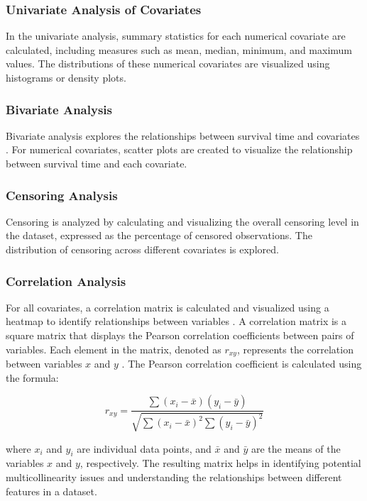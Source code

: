 \subsubsection*{Univariate Analysis of Covariates}

In the univariate analysis, summary statistics for each numerical covariate are calculated, including measures such as mean, median, minimum, and maximum values. The distributions of these numerical covariates are visualized using histograms or density plots. 

\subsubsection*{Bivariate Analysis}

Bivariate analysis explores the relationships between survival time and covariates \parencite{harrell__regression_2015}. For numerical covariates, scatter plots are created to visualize the relationship between survival time and each covariate. 

\subsubsection*{Censoring Analysis}

Censoring is analyzed by calculating and visualizing the overall censoring level in the dataset, expressed as the percentage of censored observations. The distribution of censoring across different covariates is explored.
\subsubsection*{Correlation Analysis}
For all covariates, a correlation matrix is calculated and visualized using a heatmap to identify relationships between variables \parencite{harrell__regression_2015}. A correlation matrix is a square matrix that displays the Pearson correlation coefficients between pairs of variables. Each element in the matrix, denoted as \( r_{xy} \), represents the correlation between variables \( x \) and \( y \) \parencite{harrell__regression_2015}. The Pearson correlation coefficient is calculated using the formula:

\[
r_{xy} = \frac{\sum (x_i - \bar{x})(y_i - \bar{y})}{\sqrt{\sum (x_i - \bar{x})^2 \sum (y_i - \bar{y})^2}}
\]

\noindent where \( x_i \) and \( y_i \) are individual data points, and \( \bar{x} \) and \( \bar{y} \) are the means of the variables \( x \) and \( y \), respectively. The resulting matrix helps in identifying potential multicollinearity issues and understanding the relationships between different features in a dataset.



